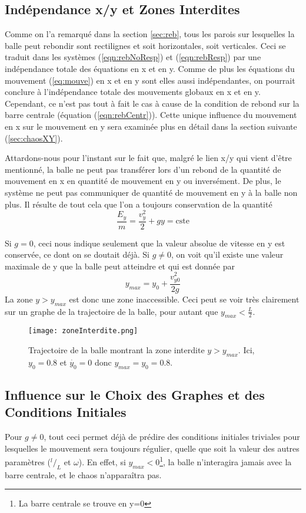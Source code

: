 \documentclass[a4paper]{report}
\begin{document}
\subsection{Indépendance x/y et Zones Interdites}
\label{sec:zoneInter}
Comme on l'a remarqué dans la section \ref{sec:reb}, tous les parois sur lesquelles la balle peut rebondir sont rectilignes et soit horizontales, soit verticales. Ceci se traduit dans les systèmes (\ref{eqn:rebNoResp}) et (\ref{eqn:rebResp}) par une indépendance totale des équations en x et en y. Comme de plus les équations du mouvement (\ref{eq:mouve}) en x et en y sont elles aussi indépendantes, on pourrait conclure à l'indépendance totale des mouvements globaux en x et en y. Cependant, ce n'est pas tout à fait le cas à cause de la condition de rebond sur la barre centrale (équation (\ref{eqn:rebCentr})). Cette unique influence du mouvement en x sur le mouvement en y sera examinée plus en détail dans la section suivante (\ref{sec:chaosXY}).

Attardons-nous pour l'instant sur le fait que, malgré le lien x/y qui vient d'être mentionné, la balle ne peut pas transférer lors d'un rebond de la quantité de mouvement en x en quantité de mouvement en y ou inversément. De plus, le système ne peut pas communiquer de quantité de mouvement en y à la balle non plus. Il résulte de tout cela que l'on a toujours conservation de la quantité
\begin{equation}
\label{eqn:consY}
\frac{E_y}{m}=\frac{v_y^2}{2}+gy=\text{cste}
\end{equation}



Si \(g=0\), ceci nous indique seulement que la valeur absolue de vitesse en y est conservée, ce dont on se doutait déjà. Si \(g \neq 0 \), on voit qu'il existe une valeur maximale de y que la balle peut atteindre et qui est donnée par
\[ y_{max}=y_0 + \frac{v^2_{y0}}{2g} \]
La zone \(y>y_{max}\) est donc une zone inaccessible. Ceci peut se voir très clairement sur un graphe de la trajectoire de la balle, pour autant que \( y_{max}<\frac{L}{2} \).
\begin{figure}[h!]
   \texttt{[image: zoneInterdite.png]}
      \caption[Trajectoire de la balle montrant la zone interdite en y]{Trajectoire de la balle montrant la zone interdite \(y>y_{max}\). Ici, \(y_0=0.8\) et \(\dot{y_0}=0\) donc \(y_{max}=y_0=0.8\).}
\end{figure}

\subsection{Influence sur le Choix des Graphes et des Conditions Initiales}
\label{sec:choixCondInit}
Pour \( g \neq 0 \), tout ceci permet déjà de prédire des conditions initiales triviales pour lesquelles le mouvement sera toujours régulier, quelle que soit la valeur des autres paramètres (\(^l/_L\) et \(\omega\)). En effet, si \(y_{max}<0\)\footnote{La barre centrale se trouve en y=0}, la balle n'interagira jamais avec la barre centrale, et le chaos n'apparaîtra pas.
\end{document}

